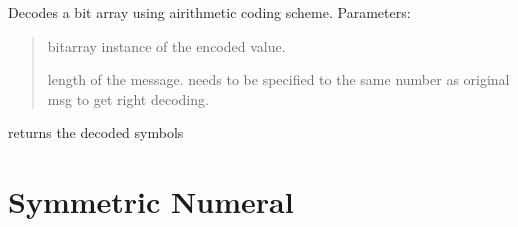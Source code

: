 \documentclass[letterpaper,10pt,english]{sphinxmanual}
\begin{document}
\begin{fulllineitems}
\begin{fulllineitems}
\label{\detokenize{arithmetic_coding:arithmetic_coding.RangeDecoder.decode}}
\pysigstartsignatures
{}
\pysigstopsignatures
\sphinxAtStartPar
Decodes a bit array using airithmetic coding scheme. 
Parameters:
\begin{quote}
\begin{description}
\sphinxAtStartPar
bitarray instance of the encoded value.

\sphinxAtStartPar
length of the message. needs to be specified to the same number as original msg to get right decoding.

\end{description}
\end{quote}
\begin{description}
\begin{description}
\sphinxAtStartPar
returns the decoded symbols

\end{description}

\end{description}

\end{fulllineitems}


\end{fulllineitems}


\sphinxstepscope


\section{Symmetric Numeral}
\label{\detokenize{symmetric_numeral:module-symmetric_numeral}}\label{\detokenize{symmetric_numeral:symmetric-numeral}}\label{\detokenize{symmetric_numeral::doc}}
\end{document}
